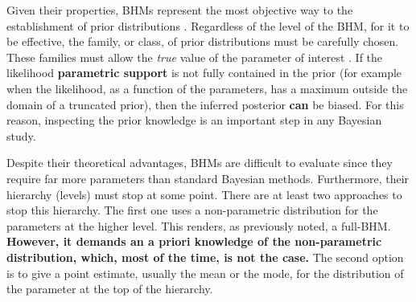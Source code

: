 Given their properties, BHMs represent the most objective way to the establishment of prior distributions \citep{Gelman2006}. Regardless of the level of the BHM, for it to be effective, the family, or class, of prior distributions must be carefully chosen. These families must allow the \emph{true} value of the parameter of interest \citep{Morris1983}. If the likelihood \textbf{parametric support} is not fully contained in the prior (for example when the likelihood, as a function of the parameters, has a maximum outside the domain of a truncated prior), then the inferred posterior \textbf{can} be biased. For this reason, inspecting the prior knowledge is an important step in any Bayesian study.

Despite their theoretical advantages, BHMs are difficult to evaluate since they require far more parameters than standard Bayesian methods.
Furthermore, their hierarchy (levels) must stop at some point. There are at least two approaches to stop this hierarchy. The first one uses a non-parametric distribution for the parameters at the higher level. This renders, as previously noted, a full-BHM. \textbf{However, it demands an a priori knowledge of the non-parametric distribution, which, most of the time, is not the case.} The second option is to give a point estimate, usually the mean or the mode, for the distribution of the parameter at the top of the hierarchy.  

